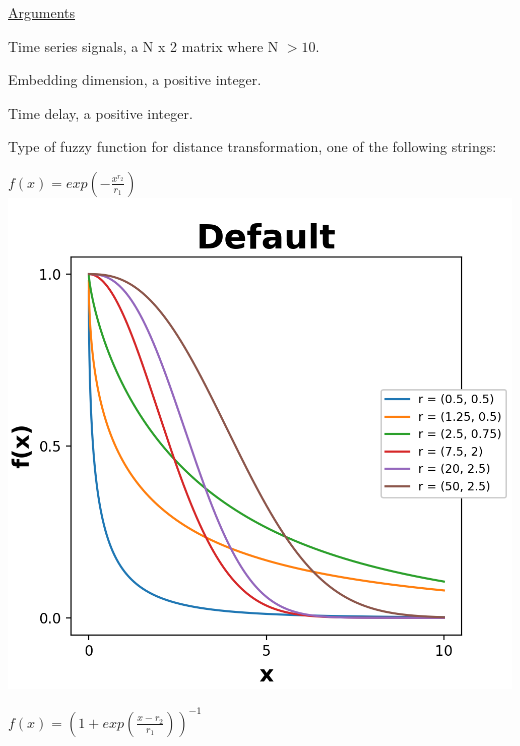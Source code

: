 \documentclass[12pt, a4paper, titlepage, openany]{book}
\begin{document}
\noindent \ul{Arguments}
\begin{description}[labelsep=1cm, labelwidth=2cm, nosep,style=multiline,leftmargin=3cm]\footnotesize
\item[\texttt{Sig}]		Time series signals, a N x 2 matrix where N $> 10$.
\item[\texttt{m}]		Embedding dimension, a positive integer.
\item[\texttt{tau}]		Time delay, a positive integer.
\item[\texttt{Fx}]		Type of fuzzy function for distance transformation, one of the following strings:
	\begin{description}[labelsep=14em, labelwidth=10em, nosep,style=multiline,leftmargin=6cm]
	\item[\texttt{"default"}]	$f(x) = exp(-\frac{x^{r_2}}{r_1})$\\
		\includegraphics[scale=.5]{Fuzz2.png}
	\item[\texttt{"sigmoid"/"modsampen"}]	$f(x) = (1+exp(\frac{x-r_2}{r_1}))^{-1}$\\

\end{description}
\end{description}
\end{document}
